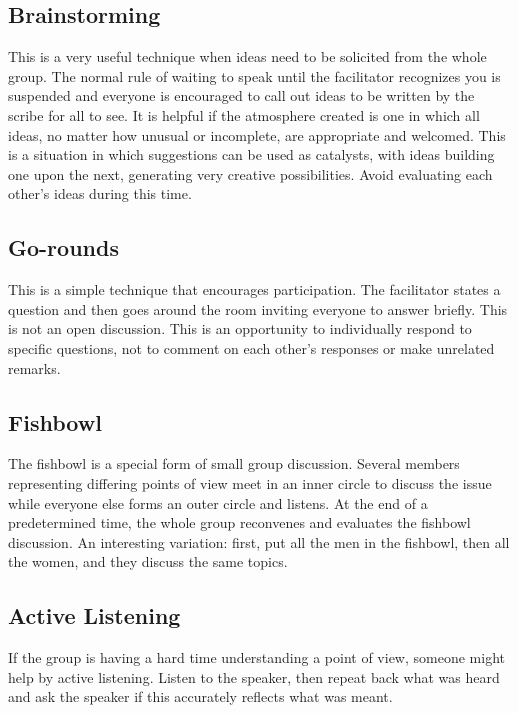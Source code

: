 \subsection{Brainstorming}
\label{sec:brainstorming}

This is a very useful technique when ideas need to be solicited
from the whole group. The normal rule of waiting to speak until the
facilitator recognizes you is suspended and everyone is encouraged
to call out ideas to be written by the scribe for all to see. It is
helpful if the atmosphere created is one in which all ideas, no
matter how unusual or incomplete, are appropriate and
welcomed. This is a situation in which suggestions can be used as
catalysts, with ideas building one upon the next, generating very
creative possibilities. Avoid evaluating each other's ideas
during this time.

\subsection{Go-rounds}

This is a simple technique that encourages participation. The
facilitator states a question and then goes around the room
inviting everyone to answer briefly. This is not an open
discussion. This is an opportunity to individually respond to
specific questions, not to comment on each other's responses or
make unrelated remarks.

\subsection{Fishbowl}

The fishbowl is a special form of small group discussion. Several
members representing differing points of view meet in an inner
circle to discuss the issue while everyone else forms an outer
circle and listens. At the end of a predetermined time, the whole
group reconvenes and evaluates the fishbowl discussion. An
interesting variation: first, put all the men in the fishbowl, then
all the women, and they discuss the same topics.

\subsection{Active Listening}
If the group is having a hard time understanding a point of view,
someone might help by active listening. Listen to the speaker, then
repeat back what was heard and ask the speaker if this accurately
reflects what was meant.

